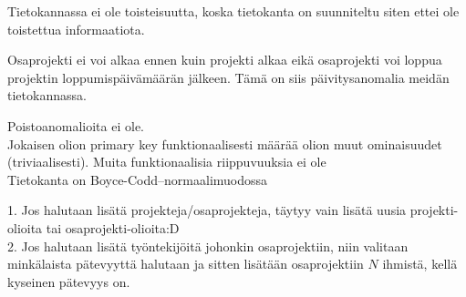 \documentclass{article}
\begin{document}
\newpage




Tietokannassa ei ole toisteisuutta, koska tietokanta on suunniteltu siten ettei ole toistettua informaatiota.

Osaprojekti ei voi alkaa ennen kuin projekti alkaa eikä osaprojekti voi loppua projektin loppumispäivämäärän jälkeen. Tämä on siis päivitysanomalia meidän tietokannassa.

Poistoanomalioita ei ole.
\\







Jokaisen olion primary key funktionaalisesti määrää olion muut ominaisuudet (triviaalisesti). Muita funktionaalisia riippuvuuksia ei ole
\\

Tietokanta on Boyce-Codd--normaalimuodossa




\newpage

1. Jos halutaan lisätä projekteja/osaprojekteja, täytyy vain lisätä uusia projekti-olioita tai osaprojekti-olioita\quad :D
\\

2. Jos halutaan lisätä työntekijöitä johonkin osaprojektiin, niin valitaan minkälaista pätevyyttä halutaan ja sitten lisätään osaprojektiin $N$ ihmistä, kellä kyseinen pätevyys on.
\\
\end{document}
